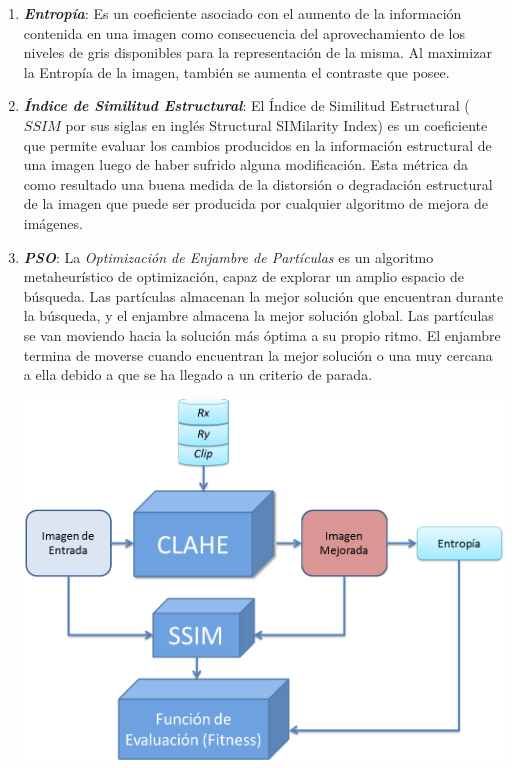 \documentclass[a0,landscape,spanish]{a0poster}
\begin{document}
\begin{multicols}{3}
\begin{enumerate}
\item {\it \textbf{Entropía}}: Es un coeficiente asociado con el aumento de la información contenida en una imagen como consecuencia del aprovechamiento de los niveles de gris disponibles para la representación de la misma. Al maximizar la Entropía de la imagen, también se aumenta el contraste que posee. 

\item {\it \textbf{Índice de Similitud Estructural}}: El Índice de Similitud Estructural ($SSIM$ por sus siglas en inglés Structural SIMilarity Index) es un coeficiente que permite evaluar los cambios producidos en la información estructural de una imagen luego de haber sufrido alguna modificación. Esta métrica da como resultado una buena medida de la distorsión o degradación estructural de la imagen que puede ser producida por cualquier algoritmo de mejora de imágenes.

\item{\it \textbf{PSO}}: La \textit{Optimización de Enjambre de Partículas} es un algoritmo metaheurístico de optimización, capaz de explorar un amplio espacio de búsqueda. Las partículas almacenan la mejor solución que encuentran durante la búsqueda, y el enjambre almacena la mejor solución global. Las partículas se van moviendo hacia la solución más óptima a su propio ritmo. El enjambre termina de moverse cuando encuentran la mejor solución o una muy cercana a ella debido a que se ha llegado a un criterio de parada.

\begin{center}\vspace{0.5cm}
\includegraphics[width=0.55\linewidth]{particula_clahe}
\label{esquema_evaluacion_pso_clahe}
\end{center}\vspace{0.5cm}

\end{enumerate}


\end{multicols}
\end{document}
